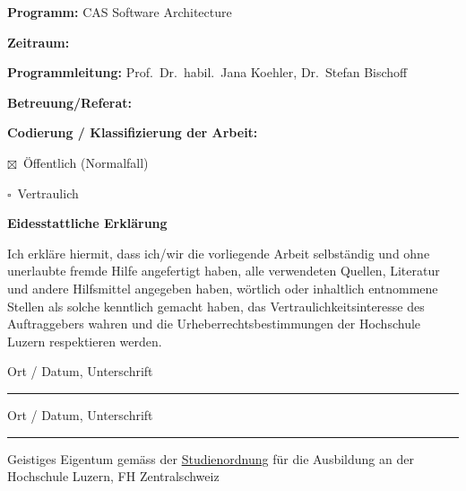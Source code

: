 \documentclass[12pt,a4paper]{article}
\newcommand{\checkedbox}{\(\boxtimes\)}
\newcommand{\uncheckedbox}{\(\square\)}
\begin{document}
\vspace{0.8cm}

\noindent
\textbf{Programm:} CAS Software Architecture

\vspace{0.6cm}

\noindent
\textbf{Zeitraum:}

\vspace{0.8cm}

\noindent
\textbf{Programmleitung:} Prof.\ Dr.\ habil.\ Jana Koehler, Dr.\ Stefan Bischoff

\vspace{0.6cm}

\noindent
\textbf{Betreuung/Referat:} 

\vspace{1.2cm}

\noindent
\textbf{Codierung / Klassifizierung der Arbeit:}

\vspace{0.4cm}

\noindent
\checkedbox\ Öffentlich (Normalfall)

\noindent
\uncheckedbox\ Vertraulich

\vspace{1.2cm}

\noindent
\textbf{Eidesstattliche Erklärung}

\vspace{0.4cm}

\noindent
Ich erkläre hiermit, dass ich/wir die vorliegende Arbeit selbständig und ohne unerlaubte fremde Hilfe angefertigt haben, alle verwendeten Quellen, Literatur und andere Hilfsmittel angegeben haben, wörtlich oder inhaltlich entnommene Stellen als solche kenntlich gemacht haben, das Vertraulichkeitsinteresse des Auftraggebers wahren und die Urheberrechtsbestimmungen der Hochschule Luzern respektieren werden.

\vspace{1.4cm}

\noindent
Ort / Datum, Unterschrift \hspace{0.7em}\rule{10.2cm}{0.4pt}

\vspace{1.0cm}

\noindent
Ort / Datum, Unterschrift \hspace{0.7em}\rule{10.2cm}{0.4pt}

\vspace{1.6cm}

\noindent
Geistiges Eigentum gemäss der
\href{https://srl.lu.ch/app/de/texts_of_law/521/versions/3884}{Studienordnung}
für die Ausbildung an der Hochschule Luzern, FH Zentralschweiz
\end{document}
